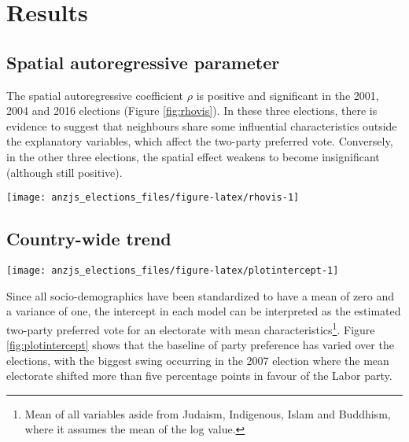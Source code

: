 \documentclass[times, doublespace]{anzsauth}
\let\rmarkdownfootnote\footnote%
\def\footnote{\protect\rmarkdownfootnote}
\let\origfigure\figure
\let\endorigfigure\endfigure
\renewenvironment{figure}[1][2] {
    \expandafter\origfigure\expandafter[htbp]
} {
    \endorigfigure
}
\begin{document}
\hypertarget{results}{%
\section{Results}\label{results}}

\hypertarget{spatial-autoregressive-parameter}{%
\subsection{Spatial autoregressive parameter}\label{spatial-autoregressive-parameter}}

The spatial autoregressive coefficient \(\rho\) is positive and significant in the 2001, 2004 and 2016 elections (Figure \ref{fig:rhovis}). In these three elections, there is evidence to suggest that neighbours share some influential characteristics outside the explanatory variables, which affect the two-party preferred vote. Conversely, in the other three elections, the spatial effect weakens to become insignificant (although still positive).

\begin{figure}[h]

{\centering \texttt{[image: anzjs\_elections\_files/figure-latex/rhovis-1]} 

}

\caption{Estimates of the spatial autoregressive parameter for each of the six elections, reported with their individual 95\% confidence intervals. Only in 2001 and 2016 is there a significant spatial component.}\label{fig:rhovis}
\end{figure}

\hypertarget{country-wide-trend}{%
\subsection{Country-wide trend}\label{country-wide-trend}}

\begin{figure}[h]

{\centering \texttt{[image: anzjs\_elections\_files/figure-latex/plotintercept-1]} 

}

\caption{Estimated intercept for each election, which represents the two-party preferred vote for an electorate with mean characteristics.}\label{fig:plotintercept}
\end{figure}

Since all socio-demographics have been standardized to have a mean of zero and a variance of one, the intercept in each model can be interpreted as the estimated two-party preferred vote for an electorate with mean characteristics\footnote{Mean of all variables aside from Judaism, Indigenous, Islam and Buddhism, where it assumes the mean of the log value.}. Figure \ref{fig:plotintercept} shows that the baseline of party preference has varied over the elections, with the biggest swing occurring in the 2007 election where the mean electorate shifted more than five percentage points in favour of the Labor party.
\end{document}
